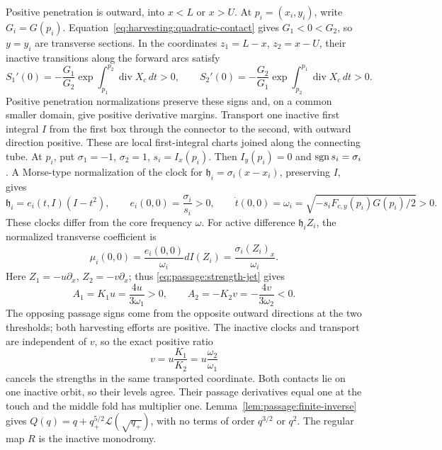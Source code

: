 Positive penetration is outward, into \(x<L\) or \(x>U\).
At \(p_i=(x_i,y_i)\), write \(G_i=G(p_i)\).
Equation~\eqref{eq:harvesting:quadratic-contact} gives \(G_1<0<G_2\), so
\(y=y_i\) are transverse sections. In the coordinates \(z_1=L-x\),
\(z_2=x-U\), their inactive transitions along the forward arcs satisfy
\[
 S_1'(0)=-\frac{G_1}{G_2}
       \exp\!\int_{p_1}^{p_2}\operatorname{div}X_c\,dt>0,
 \qquad
 S_2'(0)=-\frac{G_2}{G_1}
       \exp\!\int_{p_2}^{p_1}\operatorname{div}X_c\,dt>0.
\]
Positive penetration normalizations preserve these signs and, on a common
smaller domain, give positive derivative margins.
Transport one inactive first integral \(I\) from the first box through
the connector to the second, with outward direction positive. These are
local first-integral charts joined along the connecting tube. At
\(p_i\), put \(\sigma_1=-1\), \(\sigma_2=1\),
\(s_i=I_x(p_i)\). Then \(I_y(p_i)=0\) and
\(\operatorname{sgn} s_i=\sigma_i\). A Morse-type normalization of the clock for
\(\mathfrak h_i=\sigma_i(x-x_i)\), preserving \(I\), gives
\begin{equation}\label{eq:harvesting:clock}
 \mathfrak h_i=e_i(t,I)(I-t^2),\qquad
 e_i(0,0)=\frac{\sigma_i}{s_i}>0,\qquad
 \dot t(0,0)=\omega_i
 =\sqrt{-s_iF_{c,y}(p_i)G(p_i)/2}>0.
\end{equation}
These clocks differ from the core frequency \(\omega\). For active
difference \(\mathfrak h_iZ_i\), the normalized transverse coefficient is
\[
 \mu_i(0,0)
 =\frac{e_i(0,0)}{\omega_i}dI(Z_i)
 =\frac{\sigma_i(Z_i)_x}{\omega_i}.
\]
Here \(Z_1=-u\partial_x\), \(Z_2=-v\partial_x\); thus
\eqref{eq:passage:strength-jet} gives
\begin{equation}\label{eq:harvesting:strengths}
 A_1=K_1u=\frac{4u}{3\omega_1}>0,\qquad
 A_2=-K_2v=-\frac{4v}{3\omega_2}<0.
\end{equation}
The opposing passage signs come from the opposite outward directions at
the two thresholds; both harvesting efforts are positive.
The inactive clocks and transport are independent of \(v\), so
the exact positive ratio
\begin{equation}\label{eq:harvesting:effort-relation}
 v=u\frac{K_1}{K_2}=u\frac{\omega_2}{\omega_1}
\end{equation}
cancels the strengths in the same transported coordinate.
Both contacts lie on one inactive orbit, so their levels agree.
Their passage derivatives equal one at the touch and the middle fold
has multiplier one. Lemma~\ref{lem:passage:finite-inverse} gives
\(Q(q)=q+q_+^{5/2}\mathcal L(\sqrt{q_+})\), with no terms of order
\(q^{3/2}\) or \(q^2\). The regular map \(R\) is the inactive monodromy.

